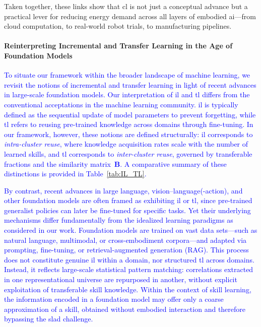 \documentclass[12pt]{article}
\newcommand\myhl[1]{\textcolor{blue}{#1}}
\renewcommand{\emph}[1]{\textit{#1}}
\begin{document}
\newline
Taken together, these links show that \ac{cl} is not just a conceptual advance but a practical lever for reducing energy demand across all layers of embodied \ac{ai}---from cloud computation, to real-world robot trials, to manufacturing pipelines.

\paragraph*{Reinterpreting Incremental and Transfer Learning in the Age of Foundation Models}

\myhl{To situate our framework within the broader landscape of machine learning, we revisit the notions of incremental and transfer learning in light of recent advances in large-scale foundation models. Our interpretation of \ac{il} and \ac{tl} differs from the conventional acceptations in the machine learning community. \Ac{il} is typically defined as the sequential update of model parameters to prevent forgetting, while \ac{tl} refers to reusing pre-trained knowledge across domains through fine-tuning. In our framework, however, these notions are defined structurally: \ac{il} corresponds to \emph{intra-cluster reuse}, where knowledge acquisition rates scale with the number of learned skills, and \ac{tl} corresponds to \emph{inter-cluster reuse}, governed by transferable fractions and the similarity matrix~$\bm{B}$. A comparative summary of these distinctions is provided in Table~\ref{tab:IL_TL}.}

\myhl{By contrast, recent advances in large language, vision--language(-action), and other foundation models are often framed as exhibiting \ac{il} or \ac{tl}, since pre-trained generalist policies can later be fine-tuned for specific tasks. Yet their underlying mechanisms differ fundamentally from the idealized learning paradigms as considered in our work. Foundation models are trained on vast data sets---such as natural language, multimodal, or cross-embodiment corpora---and adapted via prompting, fine-tuning, or retrieval-augmented generation (RAG). This process does not constitute genuine \ac{il} within a domain, nor structured \ac{tl} across domains. Instead, it reflects large-scale statistical pattern matching: correlations extracted in one representational universe are repurposed in another, without explicit exploitation of transferable skill knowledge. Within the context of skill learning, the information encoded in a foundation model may offer only a coarse approximation of a skill, obtained without embodied interaction and therefore bypassing the \ac{slad} challenge.}
\end{document}
